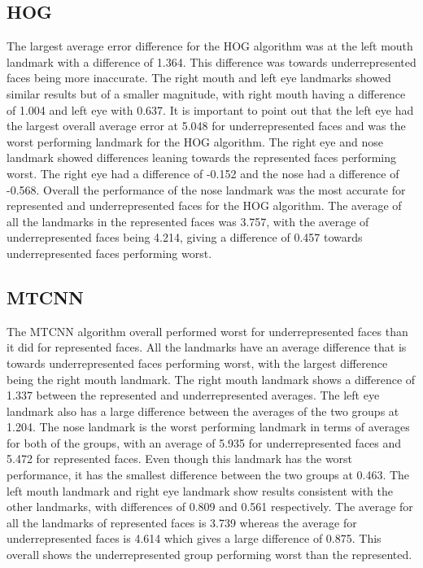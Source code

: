 \documentclass{l4proj}
\begin{document}
\subsection{HOG}
The largest average error difference for the HOG algorithm was at the left mouth landmark with a difference of 1.364. This difference was towards underrepresented faces being more inaccurate. The right mouth and left eye landmarks showed similar results but of a smaller magnitude, with right mouth having a difference of 1.004 and left eye with 0.637. It is important to point out that the left eye had the largest overall average error at 5.048 for underrepresented faces and was the worst performing landmark for the HOG algorithm. The right eye and nose landmark showed differences leaning towards the represented faces performing worst. The right eye had a difference of -0.152 and the nose had a difference of -0.568. Overall the performance of the nose landmark was the most accurate for represented and underrepresented faces for the HOG algorithm. The average of all the landmarks in the represented faces was 3.757, with the average of underrepresented faces being 4.214, giving a difference of 0.457 towards underrepresented faces performing worst. 
\subsection{MTCNN}
The MTCNN algorithm overall performed worst for underrepresented faces than it did for represented faces. All the landmarks have an average difference that is towards underrepresented faces performing worst, with the largest difference being the right mouth landmark. The right mouth landmark shows a difference of 1.337 between the represented and underrepresented averages. The left eye landmark also has a large difference between the averages of the two groups at 1.204. The nose landmark is the worst performing landmark in terms of averages for both of the groups, with an average of 5.935 for underrepresented faces and 5.472 for represented faces. Even though this landmark has the worst performance, it has the smallest difference between the two groups at 0.463. The left mouth landmark and right eye landmark show results consistent with the other landmarks, with differences of 0.809 and 0.561 respectively. The average for all the landmarks of represented faces is 3.739 whereas the average for underrepresented faces is 4.614 which gives a large difference of 0.875. This overall shows the underrepresented group performing worst than the represented.
\end{document}
